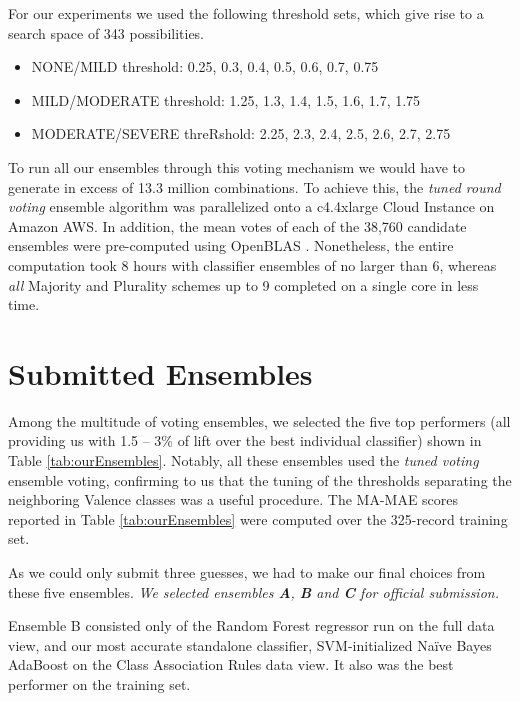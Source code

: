 For our experiments we used the following threshold sets, which give rise to
a search space of 343 possibilities.

\begin{itemize}
    \item \textsf{NONE/MILD threshold}: \textsf{0.25, 0.3, 0.4, 0.5, 0.6, 0.7, 0.75}
    \item \textsf{MILD/MODERATE threshold}: \textsf{1.25, 1.3, 1.4, 1.5, 1.6, 1.7, 1.75}
    \item \textsf{MODERATE/SEVERE threRshold}: \textsf{2.25, 2.3, 2.4, 2.5, 2.6, 2.7, 2.75}
\end{itemize}


To run all our ensembles through this voting mechanism we would have to generate
in excess of 13.3 million combinations. To achieve this,  the \textit{tuned round voting}
ensemble algorithm was parallelized onto a \textsf{c4.4xlarge} Cloud Instance on Amazon AWS. In addition, the mean votes of each of the 38,760 candidate ensembles were pre-computed using OpenBLAS \cite{open-blas}. Nonetheless, the entire computation took 8 hours with classifier ensembles of no larger than 6, whereas \textit{all}  Majority and Plurality schemes up to 9 completed on a single core in less time. %

\section{Submitted Ensembles}

Among the multitude of voting ensembles, we selected the five top performers (all
providing us with 1.5 -- 3\% of lift over the best individual
classifier) shown in Table \ref{tab:ourEnsembles}. Notably,
all these ensembles used the \textit{tuned voting} ensemble voting, confirming to us that the tuning of the thresholds
separating the neighboring \textsf{Valence} classes was a
useful procedure. The \textsf{MA-MAE} scores
reported in Table \ref{tab:ourEnsembles} were computed
over the 325-record training set.

As we could only submit three guesses, we had to make our final
choices from these five ensembles. 
\textit{
We selected ensembles \textbf{A}, \textbf{B} and \textbf{C} for official submission.}

\textsf{Ensemble B} consisted only of the Random Forest regressor
run on the full data view, and our most accurate standalone
classifier, SVM-initialized Na\"{i}ve Bayes AdaBoost on the Class Association
Rules data view. It also was the best performer on the training set.

